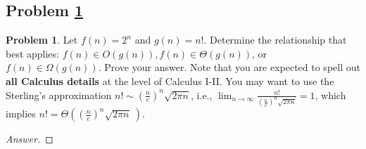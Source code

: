 \documentclass[11pt]{article}
\theoremstyle{definition}
\theoremstyle{definition}
\newtheorem{required}{Problem}
\theoremstyle{definition}
\begin{document}
\subsection{Problem \ref{Asymptotics}}
\begin{required} \label{Asymptotics}
Let $f(n) = 2^n$ and $g(n) = n!$. Determine the relationship that best applies: $f(n) \in O(g(n)), f(n) \in \Theta(g(n))$, or $f(n) \in \Omega(g(n))$. Prove your answer. Note that you are expected to spell out \textbf{all Calculus details} at the level of Calculus I-II. You may want to use the Sterling's approximation $n! \sim \left(\frac{n}{e}\right)^n \sqrt{2 \pi n}$, i.e., $\lim_{n \to \infty} \frac{n!}{\left(\frac{n}{e}\right)^n \sqrt{2 \pi n}} = 1$, which implies $n! = \Theta \left( \left(\frac{n}{e}\right)^n \sqrt{2 \pi n}~\right)$.
\end{required}



\begin{proof}[Answer]
\end{proof}





\end{document}

